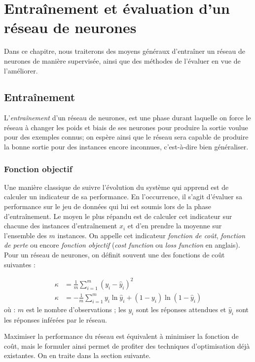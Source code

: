 \chapter{Entraînement et évaluation d'un réseau de neurones}\label{ch:ent_test_valid}

Dans ce chapitre, nous traiterons des moyens généraux d'entraîner un réseau de neurones de manière supervisée, ainsi que des méthodes de l'évaluer en vue de l'améliorer.

\section{Entraînement}
L'\emph{entraînement} d'un réseau de neurones, est une phase durant laquelle on force le réseau à changer les poids et biais de ses neurones pour produire la sortie voulue pour des exemples connus; on espère ainsi que le réseau sera capable de produire la bonne sortie pour des instances encore inconnues, c'est-à-dire bien généraliser.

\subsection{Fonction objectif}
Une manière classique de suivre l'évolution du système qui apprend est de calculer un indicateur de sa performance. En l'occurrence, il s'agit d'évaluer sa performance sur le jeu de données qui lui est soumis lors de la phase d'entraînement. Le moyen le plus répandu est de calculer cet indicateur sur chacune des instances d'entraînement \(x_i\) et d'en prendre la moyenne sur l'ensemble des \(m\) instances. On appelle cet indicateur \emph{fonction de coût}, \emph{fonction de perte} ou encore \emph{fonction objectif} (\emph{cost function} ou \emph{loss function} en anglais). Pour un réseau de neurones, on définit souvent une des fonctions de coût suivantes :

\begin{align}
\kappa &= \frac{1}{m}\sum_{i = 1}^m (y_i - \hat{y}_i)^2\\
\kappa &= - \frac{1}{m}\sum_{i = 1}^m y_i \ln{\hat{y}_i} + (1 - y_i)\ln{(1 - \hat{y}_i)}
\end{align}
où : \(m\) est le nombre d'observations ; les \(y_i\) sont les réponses attendues et \(\hat{y}_i\) sont les réponses inférées par le réseau.

Maximiser la performance du réseau est équivalent à minimiser la fonction de coût, mais le formuler ainsi permet de profiter des techniques d'optimisation déjà existantes. On en traite dans la section suivante.

